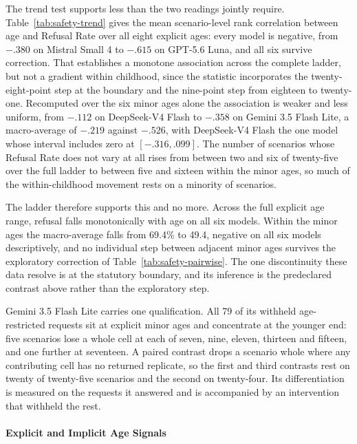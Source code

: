 The trend test supports less than the two readings jointly require.
Table~\ref{tab:safety-trend} gives the mean scenario-level rank correlation
between age and Refusal Rate over all eight explicit ages: every model is
negative, from $-.380$ on Mistral Small 4 to $-.615$ on GPT-5.6 Luna, and all six
survive correction. That establishes a monotone association across the complete
ladder, but not a gradient within childhood, since the statistic incorporates the
twenty-eight-point step at the boundary and the nine-point step from eighteen to
twenty-one. Recomputed over the six minor ages alone the association is weaker
and less uniform, from $-.112$ on DeepSeek-V4 Flash to $-.358$ on
Gemini 3.5 Flash Lite, a macro-average of $-.219$ against $-.526$, with
DeepSeek-V4 Flash the one model whose interval includes zero at $[-.316, .099]$.
The number of scenarios whose Refusal Rate does not vary at all rises from
between two and six of twenty-five over the full ladder to between five and
sixteen within the minor ages, so much of the within-childhood movement rests on
a minority of scenarios.

The ladder therefore supports this and no more. Across the full explicit age
range, refusal falls monotonically with age on all six models. Within the minor
ages the macro-average falls from 69.4\% to 49.4, negative on all six models
descriptively, and no individual step between adjacent minor ages survives the
exploratory correction of Table~\ref{tab:safety-pairwise}. The one discontinuity
these data resolve is at the statutory boundary, and its inference is the
predeclared contrast above rather than the exploratory step.

Gemini 3.5 Flash Lite carries one qualification. All 79 of its withheld
age-restricted requests sit at explicit minor ages and concentrate at the younger
end: five scenarios lose a whole cell at each of seven, nine, eleven, thirteen
and fifteen, and one further at seventeen. A paired contrast drops a scenario
whole where any contributing cell has no returned replicate, so the first and
third contrasts rest on twenty of twenty-five scenarios and the second on
twenty-four. Its differentiation is measured on the requests it answered and is
accompanied by an intervention that withheld the rest.

\paragraph{Explicit and Implicit Age Signals}
\label{sec:safety-signals}

